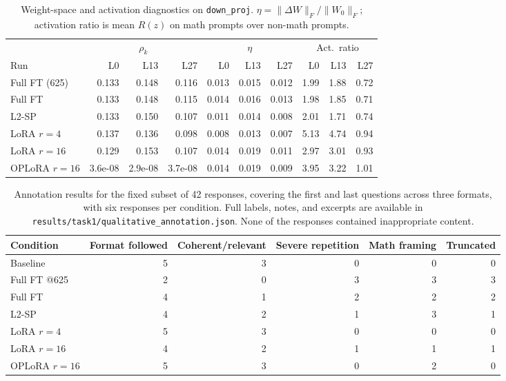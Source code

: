 \documentclass{article}
\begin{document}
\begin{table}[H]
\caption{Weight-space and activation diagnostics on \texttt{down\_proj}. $\eta=\|\Delta W\|_F/\|W_0\|_F$; activation
ratio is mean $R(z)$ on math prompts over non-math prompts.}
\label{tab:t1diag}
\centering
\small
\begin{tabular}{lrrrrrrrrr}
\toprule
 & \multicolumn{3}{c}{$\rho_k$} & \multicolumn{3}{c}{$\eta$} & \multicolumn{3}{c}{Act.\ ratio} \\
Run & L0 & L13 & L27 & L0 & L13 & L27 & L0 & L13 & L27 \\
\midrule
Full FT (625) & 0.133 & 0.148 & 0.116 & 0.013 & 0.015 & 0.012 & 1.99 & 1.88 & 0.72 \\
Full FT & 0.133 & 0.148 & 0.115 & 0.014 & 0.016 & 0.013 & 1.98 & 1.85 & 0.71 \\
L2-SP & 0.133 & 0.150 & 0.107 & 0.011 & 0.014 & 0.008 & 2.01 & 1.71 & 0.74 \\
LoRA $r{=}4$ & 0.137 & 0.136 & 0.098 & 0.008 & 0.013 & 0.007 & 5.13 & 4.74 & 0.94 \\
LoRA $r{=}16$ & 0.129 & 0.153 & 0.107 & 0.014 & 0.019 & 0.011 & 2.97 & 3.01 & 0.93 \\
OPLoRA $r{=}16$ & 3.6e-08 & 2.9e-08 & 3.7e-08 & 0.014 & 0.019 & 0.009 & 3.95 & 3.22 & 1.01 \\
\bottomrule
\end{tabular}
\end{table}

\begin{table}[H]
\caption{Annotation results for the fixed subset of 42 responses, covering the first and last questions across three formats, with six responses per condition. Full labels, notes, and excerpts are available in \texttt{results/task1/qualitative\_annotation.json}. None of the responses contained inappropriate content.}
\label{tab:t1annot}
\centering
\small
\begin{tabular}{lrrrrr}
\toprule
Condition & Format followed & Coherent/relevant & Severe repetition & Math framing & Truncated \\
\midrule
Baseline & 5 & 3 & 0 & 0 & 0 \\
Full FT @625 & 2 & 0 & 3 & 3 & 3 \\
Full FT & 4 & 1 & 2 & 2 & 2 \\
L2-SP & 4 & 2 & 1 & 3 & 1 \\
LoRA $r{=}4$ & 5 & 3 & 0 & 0 & 0 \\
LoRA $r{=}16$ & 4 & 2 & 1 & 1 & 1 \\
OPLoRA $r{=}16$ & 5 & 3 & 0 & 2 & 0 \\
\bottomrule
\end{tabular}
\end{table}
\end{document}
